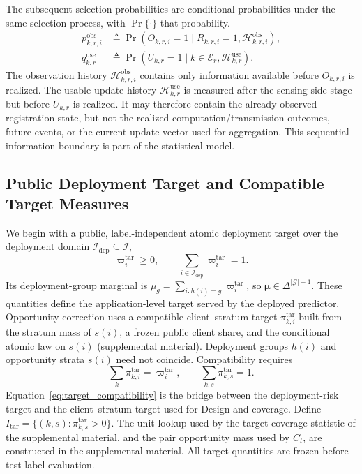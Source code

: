 \documentclass[letterpaper,journal]{IEEEtran}
\begin{document}
The subsequent selection probabilities are conditional probabilities under the
same selection process, with $\Pr\{\cdot\}$ that probability.
\begin{align}
 p^{\mathrm{obs}}_{k,r,i}
 &\triangleq
 \Pr\!\left(
 O_{k,r,i}=1
 \mid
 R_{k,r,i}=1,\mathcal{H}^{\mathrm{obs}}_{k,r,i}
 \right),
 \label{eq:pobs_def}\\
 q^{\mathrm{use}}_{k,r}
 &\triangleq
 \Pr\!\left(
 U_{k,r}=1
 \mid
 k\in\mathcal{E}_r,\mathcal{H}^{\mathrm{use}}_{k,r}
 \right).
 \label{eq:quse_def}
\end{align}
The observation history $\mathcal{H}^{\mathrm{obs}}_{k,r,i}$ contains
only information available before $O_{k,r,i}$ is realized.  The
usable-update history $\mathcal{H}^{\mathrm{use}}_{k,r}$ is measured
after the sensing-side stage but before $U_{k,r}$ is realized.  It may
therefore contain the already observed registration state, but not the
realized computation/transmission outcomes, future events, or the
current update vector used for aggregation.  This sequential
information boundary is part of the statistical model.

\subsection{Public Deployment Target and Compatible Target Measures}
\label{subsec:target_measures}

We begin with a public, label-independent atomic deployment target over the
deployment domain $\mathcal{I}_{\mathrm{dep}}\subseteq\mathcal{I}$,
\begin{equation}
    \varpi_i^{\mathrm{tar}}\ge0,
    \qquad
    \sum_{i\in\mathcal{I}_{\mathrm{dep}}}
    \varpi_i^{\mathrm{tar}}=1.
    \label{eq:atomic_target}
\end{equation}
Its deployment-group marginal is
$\mu_g=\sum_{i:h(i)=g}\varpi_i^{\mathrm{tar}}$, so
$\boldsymbol{\mu}\in\Delta^{|\mathcal{G}|-1}$.
These quantities define the application-level target served by the deployed
predictor.  Opportunity correction uses a compatible client--stratum target
$\pi^{\mathrm{tar}}_{k,i}$ built from the stratum mass of $s(i)$, a frozen
public client share, and the conditional atomic law on $s(i)$
(supplemental material).  Deployment groups $h(i)$ and opportunity strata
$s(i)$ need not coincide.  Compatibility requires
\begin{equation}
    \sum_k\pi^{\mathrm{tar}}_{k,i}
    =
    \varpi_i^{\mathrm{tar}},
    \qquad
    \sum_{k,s}\pi^{\mathrm{tar}}_{k,s}=1.
    \label{eq:target_compatibility}
\end{equation}
Equation~\eqref{eq:target_compatibility} is the bridge between the
deployment-risk target and the client--stratum target used for Design
and coverage.  Define $I_{\mathrm{tar}}=\{(k,s):\pi^{\mathrm{tar}}_{k,s}>0\}$.
The unit lookup used by the target-coverage statistic of the supplemental
material, and the pair opportunity mass used by
$C_t$, are constructed in the supplemental material.
All target quantities are frozen before test-label evaluation.
\end{document}
